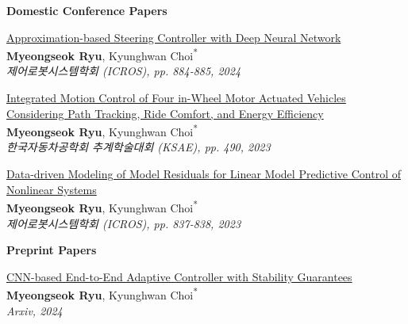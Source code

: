 \textbf{Domestic Conference Papers}

\footnotesize{\begin{etaremune}

    \item {
        \href{https://www.dbpia.co.kr/journal/articleDetail?nodeId=NODE11909146}{Approximation-based Steering Controller with Deep Neural Network}
        \\
        \textbf{Myeongseok Ryu}, Kyunghwan Choi\textsuperscript{{*}}
        \\
        \textit{
            제어로봇시스템학회 (ICROS), pp. 884-885, 2024
        }
    }

    \item {
        \href{https://www.dbpia.co.kr/journal/articleDetail?nodeId=NODE11665897}{Integrated Motion Control of Four in-Wheel Motor Actuated Vehicles Considering Path Tracking, Ride Comfort, and Energy Efficiency}
        \\
        \textbf{Myeongseok Ryu}, Kyunghwan Choi\textsuperscript{{*}}
        \\
        \textit{
            한국자동차공학회 추계학술대회 (KSAE), pp. 490, 2023
        }
    }

    \item {
        \href{https://www.dbpia.co.kr/journal/articleDetail?nodeId=NODE11480596}{Data-driven Modeling of Model Residuals for Linear Model Predictive Control of Nonlinear Systems}
        \\
        \textbf{Myeongseok Ryu}, Kyunghwan Choi\textsuperscript{{*}}
        \\
        \textit{
            제어로봇시스템학회 (ICROS), pp. 837-838, 2023
        }
    }

\end{etaremune}}
    
\textbf{Preprint Papers}

\footnotesize{\begin{etaremune}

    \item {
        \href{https://doi.org/10.48550/arXiv.2403.03499}{CNN-based End-to-End Adaptive Controller with Stability Guarantees}
        \\
        \textbf{Myeongseok Ryu}, Kyunghwan Choi\textsuperscript{{*}}
        \\
        \textit{
            Arxiv, 2024
        }
    }

\end{etaremune}}
    